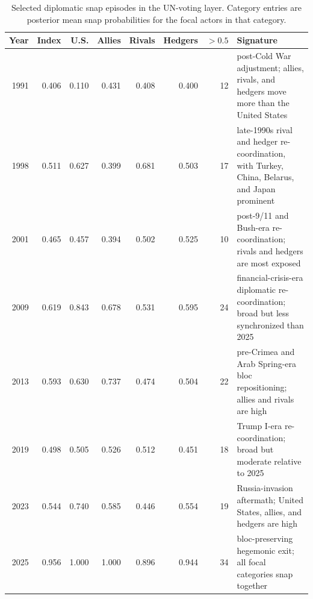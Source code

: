 \begin{table}[ht]
\centering
\caption{Selected diplomatic snap episodes in the UN-voting layer. Category entries are posterior mean snap probabilities for the focal actors in that category.}
\label{tab:episode-typology}
\scriptsize
\begin{tabularx}{\textwidth}{@{}r r r r r r r X@{}}
\toprule
\textbf{Year} & \textbf{Index} & \textbf{U.S.} & \textbf{Allies} & \textbf{Rivals} & \textbf{Hedgers} & \textbf{$>0.5$} & \textbf{Signature} \\
\midrule
1991 & 0.406 & 0.110 & 0.431 & 0.408 & 0.400 & 12 & post-Cold War adjustment; allies, rivals, and hedgers move more than the United States \\
1998 & 0.511 & 0.627 & 0.399 & 0.681 & 0.503 & 17 & late-1990s rival and hedger re-coordination, with Turkey, China, Belarus, and Japan prominent \\
2001 & 0.465 & 0.457 & 0.394 & 0.502 & 0.525 & 10 & post-9/11 and Bush-era re-coordination; rivals and hedgers are most exposed \\
2009 & 0.619 & 0.843 & 0.678 & 0.531 & 0.595 & 24 & financial-crisis-era diplomatic re-coordination; broad but less synchronized than 2025 \\
2013 & 0.593 & 0.630 & 0.737 & 0.474 & 0.504 & 22 & pre-Crimea and Arab Spring-era bloc repositioning; allies and rivals are high \\
2019 & 0.498 & 0.505 & 0.526 & 0.512 & 0.451 & 18 & Trump I-era re-coordination; broad but moderate relative to 2025 \\
2023 & 0.544 & 0.740 & 0.585 & 0.446 & 0.554 & 19 & Russia-invasion aftermath; United States, allies, and hedgers are high \\
2025 & 0.956 & 1.000 & 1.000 & 0.896 & 0.944 & 34 & bloc-preserving hegemonic exit; all focal categories snap together \\
\bottomrule
\end{tabularx}
\end{table}

